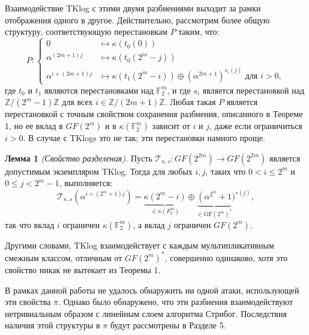 Взаимодействие TKlog с этими двумя разбиениями выходит за рамки отображения одного в другое. Действительно, рассмотрим более общую структуру, соответствующую перестановкам \( P \) таким, что:
\begin{equation}
  P :
  \begin{cases}
    0 & \mapsto \kappa (t_0(0)) \\
    \alpha^{(2m+1)j} & \mapsto \kappa (t_0(2^m - j)) \\
    \alpha^{i+(2m+1)j} & \mapsto \kappa (t_1(2^m - i)) \oplus (\alpha^{2m+1})^{s_i(j)} \text{ для } i > 0,
  \end{cases}
  \label{eq:02}
\end{equation}
где \( t_0 \) и \( t_1 \) являются перестановками над \( \mathbb{F}_{2}^{m} \), и где \( s_i \) является перестановкой над \( \mathbb{Z}/(2^m - 1)\mathbb{Z} \) для всех \( i \in \mathbb{Z}/(2m + 1)\mathbb{Z} \). Любая такая \( P \) является перестановкой с точным свойством сохранения разбиения, описанного в Теореме 1, но ее вклад в \( GF (2^m) \) и в \( \kappa(\mathbb{F}_{2}^{m}) \) зависит от \( i \) и \( j \), даже если ограничиться \( i > 0 \). В случае с TKlogs это не так; эти перестановки намного проще.

\textbf{Лемма 1} \textit{(Свойство разделения).} Пусть \( \mathscr{T}_{\kappa,s} : GF(2^{2m}) \to GF(2^{2m}) \) является допустимым экземпляром TKlog. Тогда для любых \( i, j \), таких что \( 0 < i \leq 2^m \) и \( 0 \leq j < 2^m - 1 \), выполняется:
\[
  \mathscr{T}_{\kappa, s}\left(\alpha^{i+\left(2^m+1\right) j}\right)=\underbrace{\kappa\left(2^m-i\right)}_{\in \kappa\left(F_2^m\right)} \oplus \underbrace{\left(\alpha^{2^m}+1\right.}_{\in \mathrm{GF}\left(2^m\right)^*})^{s(j)},
\]
так что вклад \( i \) ограничен \( \kappa(\mathbb{F}_{2}^{m}) \), а вклад \( j \) ограничен \( GF(2^m) \).

Другими словами, TKlog взаимодействует с каждым мультипликативным смежным классом, отличным от \( GF(2^m)^{\ast} \), совершенно одинаково, хотя это свойство никак не вытекает из Теоремы 1.

В рамках данной работы не удалось обнаружить ни одной атаки, использующей эти свойства \( \pi \). Однако было обнаружено, что эти разбиения взаимодействуют нетривиальным образом с линейным слоем алгоритма Стрибог. Последствия наличия этой структуры в \( \pi \) будут рассмотрены в Разделе 5.
